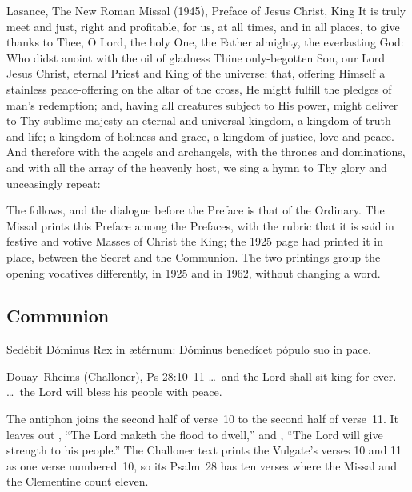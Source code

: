 \begin{englishwitness}{Lasance, The New Roman Missal (1945), Preface of Jesus Christ, King}
It is truly meet and just, right and profitable, for us, at all times, and in
all places, to give thanks to Thee, O Lord, the holy One, the Father almighty,
the everlasting God: Who didst anoint with the oil of gladness Thine
only-begotten Son, our Lord Jesus Christ, eternal Priest and King of the
universe: that, offering Himself a stainless peace-offering on the altar of
the cross, He might fulfill the pledges of man's redemption; and, having all
creatures subject to His power, might deliver to Thy sublime majesty an
eternal and universal kingdom, a kingdom of truth and life; a kingdom of
holiness and grace, a kingdom of justice, love and peace. And therefore with
the angels and archangels, with the thrones and dominations, and with all the
array of the heavenly host, we sing a hymn to Thy glory and unceasingly
repeat:
\end{englishwitness}

\noindent The  follows, and the dialogue before the Preface is
that of the Ordinary. The Missal prints this Preface among the Prefaces, with
the rubric that it is said in festive and votive Masses of Christ the King;
the 1925 page had printed it in place, between the Secret and the Communion.
The two printings group the opening vocatives differently,  in 1925 and  in 1962, without changing a word.

\subsection{Communion}
\label{proper-communion}


\begin{latinproper}
Sedébit Dóminus Rex in ætérnum: Dóminus benedícet pópulo suo in pace.
\end{latinproper}

\begin{englishwitness}{Douay--Rheims (Challoner), Ps 28:10--11}
\dots\ and the Lord shall sit king for ever. \dots\ the Lord will bless his
people with peace.
\end{englishwitness}

\noindent The antiphon joins the second half of verse~10 to the second half of
verse~11. It leaves out , ``The Lord
maketh the flood to dwell,'' and ,
``The Lord will give strength to his people.'' The Challoner text prints the
Vulgate's verses 10 and 11 as one verse numbered~10, so its Psalm~28 has ten
verses where the Missal and the Clementine count eleven.

